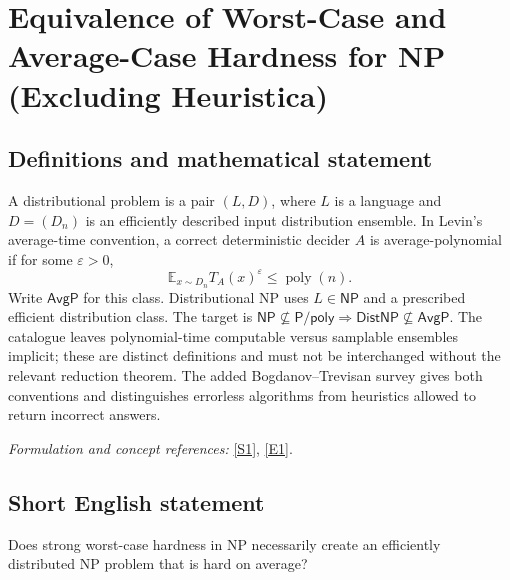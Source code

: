 \documentclass[11pt]{article}
\newcommand{\sref}[2]{\hyperlink{source:#1:#2}{[S#2]}}
\newcommand{\eref}[2]{\hyperlink{extra:#1:#2}{[E#2]}}
\newif\ifshowcatalogue
\newcommand{\cataloguescope}[1]{\ifshowcatalogue
 \paragraph{Exact scope in the supplied catalogue.}
 \begin{quote}\small #1\end{quote}\fi}
\begin{document}
\setcounter{section}{0}
\clearpage
\section*{\texorpdfstring{Equivalence of Worst-Case and Average-Case Hardness for NP (Excluding Heuristica)}{Equivalence of Worst-Case and Average-Case Hardness for NP (Excluding Heuristica)}}\label{30006698}
\subsection{Definitions and mathematical statement}
A distributional problem is a pair $(L,D)$, where $L$ is a language and $D=(D_n)$ is an efficiently described input distribution ensemble. In Levin's average-time convention, a correct deterministic decider $A$ is average-polynomial if for some $\varepsilon>0$,
\[
 \mathbb E_{x\sim D_n} T_A(x)^\varepsilon\le\operatorname{poly}(n).
\]
Write $\mathsf{AvgP}$ for this class. Distributional NP uses $L\in\mathsf{NP}$ and a prescribed efficient distribution class. The target is $\mathsf{NP}\nsubseteq\mathsf{P/poly}\Rightarrow\mathsf{DistNP}\nsubseteq\mathsf{AvgP}$. The catalogue leaves polynomial-time computable versus samplable ensembles implicit; these are distinct definitions and must not be interchanged without the relevant reduction theorem. The added Bogdanov--Trevisan survey gives both conventions and distinguishes errorless algorithms from heuristics allowed to return incorrect answers.
\par\smallskip\textit{Formulation and concept references:} \sref{30006698}{1}, \eref{30006698}{1}.
\cataloguescope{Prove or disprove that if NP is hard in the worst case (NP not in P/poly), then NP is hard on average (DistNP not in AvgP).}
\subsection{Short English statement}
Does strong worst-case hardness in NP necessarily create an efficiently distributed NP problem that is hard on average?
\end{document}
